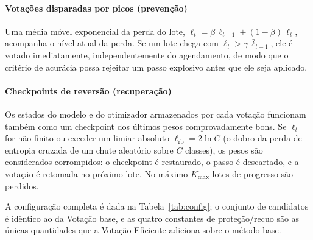 \documentclass[conference]{IEEEtran}
\begin{document}
\paragraph{Votações disparadas por picos (prevenção)} Uma média móvel exponencial da perda do lote, $\bar{\ell}_t = \beta\,\bar{\ell}_{t-1} + (1-\beta)\,\ell_t$, acompanha o nível atual da perda. Se um lote chega com $\ell_t > \gamma\,\bar{\ell}_{t-1}$, ele é votado imediatamente, independentemente do agendamento, de modo que o critério de acurácia possa rejeitar um passo explosivo antes que ele seja aplicado.

\paragraph{Checkpoints de reversão (recuperação)} Os estados do modelo e do otimizador armazenados por cada votação funcionam também como um checkpoint dos últimos pesos comprovadamente bons. Se $\ell_t$ for não finito ou exceder um limiar absoluto $\ell_{\mathrm{rb}} = 2\ln C$ (o dobro da perda de entropia cruzada de um chute aleatório sobre $C$ classes), os pesos são considerados corrompidos: o checkpoint é restaurado, o passo é descartado, e a votação é retomada no próximo lote. No máximo $K_{\max}$ lotes de progresso são perdidos.

A configuração completa é dada na Tabela~\ref{tab:config}; o conjunto de candidatos é idêntico ao da Votação base, e as quatro constantes de proteção/recuo são as únicas quantidades que a Votação Eficiente adiciona sobre o método base.

\begin{table}[htbp]
\caption{Configuração da Votação Eficiente}
\begin{center}
\end{center}
\label{tab:config}
\end{table}
\end{document}
